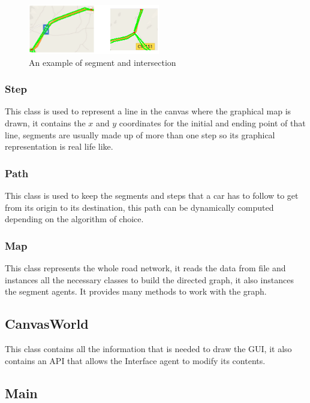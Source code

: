 \begin{figure}[!ht]
  \centering
  \includegraphics[scale=2]{images/intersectionSegment.png} 
  \caption{An example of segment and intersection}
\end{figure}

\subsubsection{Step}

This class is used to represent a line in the canvas where the graphical map is drawn, it contains the $x$ and $y$ coordinates for the initial and ending point of that line, segments are usually made up of more than one step so its graphical representation is real life like.

\subsubsection{Path}

This class is used to keep the segments and steps that a car has to follow to get from its origin to its destination, this path can be dynamically computed depending on the algorithm of choice.

\subsubsection{Map}

This class represents the whole road network, it reads the data from file and instances all the necessary classes to build the directed graph, it also instances the segment agents. It provides many methods to work with the graph.

\subsection{CanvasWorld}

This class contains all the information that is needed to draw the GUI, it also contains an API that allows the Interface agent to modify its contents.

\subsection{Main}

